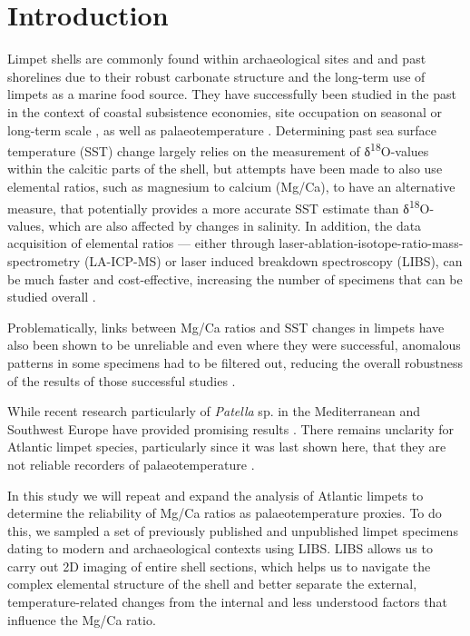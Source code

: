 \documentclass[
  authoryear,
  preprint,
  3p]{elsarticle}
\begin{document}
\section{Introduction}\label{Introduction}

Limpet shells are commonly found within archaeological sites and and
past shorelines due to their robust carbonate structure and the
long-term use of limpets as a marine food source. They have successfully
been studied in the past in the context of coastal subsistence
economies, site occupation on seasonal
\citep{shackleton1973, Parker2018-wf, Bosch2018-ud} or long-term scale
\citep{Ortiz2015-mr}, as well as palaeotemperature
\citep{Fenger2007-gf, Surge2012-ba, Wang2012-ee, Colonese2012-ct, Ferguson2011-zl}.
Determining past sea surface temperature (SST) change largely relies on
the measurement of δ\textsuperscript{18}O-values within the calcitic
parts of the shell, but attempts have been made to also use elemental
ratios, such as magnesium to calcium (Mg/Ca), to have an alternative
measure, that potentially provides a more accurate SST estimate than
δ\textsuperscript{18}O-values, which are also affected by changes in
salinity. In addition, the data acquisition of elemental ratios ---
either through laser-ablation-isotope-ratio-mass-spectrometry
(LA-ICP-MS) or laser induced breakdown spectroscopy (LIBS), can be much
faster and cost-effective, increasing the number of specimens that can
be studied overall \citep{Durham2017-fh, Hausmann2023-ih}.

Problematically, links between Mg/Ca ratios and SST changes in limpets
have also been shown to be unreliable \citep{Graniero2015-zv} and even
where they were successful, anomalous patterns in some specimens had to
be filtered out, reducing the overall robustness of the results of those
successful studies \citep{Ferguson2011-zl}.

While recent research particularly of \emph{Patella} sp. in the
Mediterranean and Southwest Europe have provided promising results
\citep{Hausmann2019-fi, Garcia-Escarzaga2015-jc, Garcia-Escarzaga2018-nf}.
There remains unclarity for Atlantic limpet species, particularly since
it was last shown here, that they are not reliable recorders of
palaeotemperature \citep{Graniero2015-zv}.

In this study we will repeat and expand the analysis of Atlantic limpets
to determine the reliability of Mg/Ca ratios as palaeotemperature
proxies. To do this, we sampled a set of previously published and
unpublished limpet specimens dating to modern and archaeological
contexts using LIBS. LIBS allows us to carry out 2D imaging of entire
shell sections, which helps us to navigate the complex elemental
structure of the shell and better separate the external,
temperature-related changes from the internal and less understood
factors that influence the Mg/Ca ratio.
\end{document}
